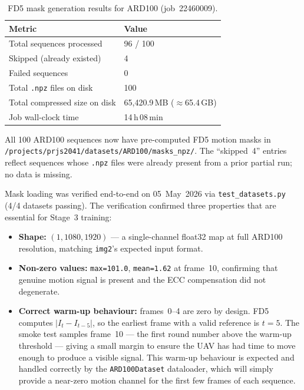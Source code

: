 \begin{table}[h]
\centering
\caption{FD5 mask generation results for ARD100 (job~22460009).}
\label{tab:masks}
\begin{tabular}{ll}
\hline
\textbf{Metric}               & \textbf{Value} \\
\hline
Total sequences processed     & 96 / 100 \\
Skipped (already existed)     & 4 \\
Failed sequences              & 0 \\
Total \texttt{.npz} files on disk & 100 \\
Total compressed size on disk & 65,420.9\,MB ($\approx$65.4\,GB) \\
Job wall-clock time           & 14\,h\,08\,min \\
\hline
\end{tabular}
\end{table}

\noindent All 100 ARD100 sequences now have pre-computed FD5 motion
masks in \texttt{/projects/prjs2041/datasets/ARD100/masks\_npz/}.
The ``skipped~4'' entries reflect sequences whose \texttt{.npz}
files were already present from a prior partial run; no data is
missing.

Mask loading was verified end-to-end on 05~May~2026 via
\texttt{test\_datasets.py} (4/4 datasets passing). The verification
confirmed three properties that are essential for Stage~3 training:
\begin{itemize}
    \item \textbf{Shape:} $(1, 1080, 1920)$ — a single-channel
          float32 map at full ARD100 resolution, matching
          \texttt{img2}'s expected input format.
    \item \textbf{Non-zero values:} \texttt{max=101.0},
          \texttt{mean=1.62} at frame~10, confirming that genuine
          motion signal is present and the ECC compensation did
          not degenerate.
    \item \textbf{Correct warm-up behaviour:} frames~0--4 are zero
          by design. FD5 computes $|I_t - I_{t-5}|$, so the earliest
          frame with a valid reference is $t=5$. The smoke test
          samples frame~10 — the first round number above the
          warm-up threshold — giving a small margin to ensure the
          UAV has had time to move enough to produce a visible
          signal. This warm-up behaviour is expected and handled
          correctly by the \texttt{ARD100Dataset} dataloader, which
          will simply provide a near-zero motion channel for the
          first few frames of each sequence.
\end{itemize}


